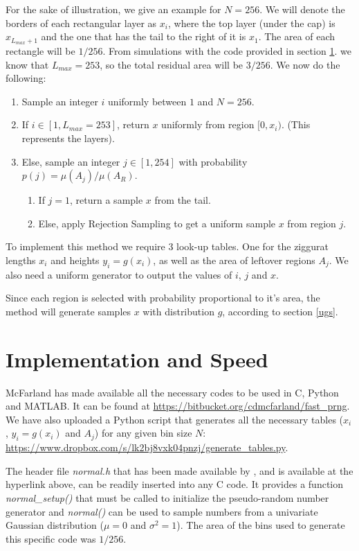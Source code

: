 \documentclass[11pt,onecolumn]{article}
\let\oldref\ref%
\def\ref{\oldref*}}
\begin{document}
For the sake of illustration, we give an example for $N=256$. We will denote the borders of each rectangular layer as $x_i$, where the top layer (under the cap) is $x_{L_{max}+1}$ and the one that has the tail to the right of it is $x_1$. The area of each rectangle will be $1/256$. From simulations with the code provided in section \ref{implementation}. we know that $L_{max}=253$, so the total residual area will be $3/256$. We now do the following:
\begin{enumerate}
	\item Sample an integer $i$ uniformly between $1$ and $N=256$.
	\item If $i\in[1,L_{max}=253]$, return $x$ uniformly from region $[0,x_i)$. (This represents the layers).
	\item Else, sample an integer $j\in[1,254]$ with probability $p(j)=\mu(A_j)/\mu(A_R)$.
	\begin{enumerate}
		\item If $j=1$, return a sample $x$ from the tail.
		\item Else, apply Rejection Sampling to get a uniform sample $x$ from region $j$.
	\end{enumerate}
\end{enumerate}

To implement this method we require 3 look-up tables. One for the ziggurat lengths $x_i$ and heights $y_i=g(x_i)$, as well as the area of leftover regions $A_j$. We also need a uniform generator to output the values of $i$, $j$ and $x$.

Since each region is selected with probability proportional to it's area, the method will generate samples $x$ with distribution $g$, according to section \ref{ugs}.

\section{Implementation and Speed}\label{implementation}
McFarland \cite{mcfarland} has made available all the necessary codes to be used in C, Python and MATLAB. It can be found at \url{https://bitbucket.org/cdmcfarland/fast_prng}. We have also uploaded a Python script that generates all the necessary tables ($x_i$, $y_i=g(x_i)$ and $A_j$) for any given bin size $N$: \url{https://www.dropbox.com/s/lk2bj8vxk04pnzj/generate_tables.py}.

The header file \textit{normal.h} that has been made available by \cite{mcfarland}, and 
is available at the hyperlink above, can be readily inserted into any C code. It provides 
a function \textit{normal\_setup()} that must be called to initialize the pseudo-random
number generator and \textit{normal()} can be used to sample numbers from a univariate
Gaussian distribution ($\mu=0$ and $\sigma^2=1$). The area of the bins used to generate this specific code was $1/256$.
\end{document}
